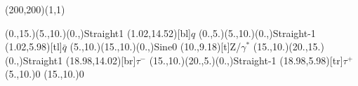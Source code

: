 \documentclass[12pt]{article}
\begin{document}
 
 \thispagestyle{empty}
	
 \begin{feynartspicture}(200,200)(1,1) 
 \FADiagram{} 

\FAProp(0.,15.)(5.,10.)(0.,){Straight}{1}
\FALabel(1.02,14.52)[bl]{$q$}
\FAProp(0.,5.)(5.,10.)(0.,){Straight}{-1}
\FALabel(1.02,5.98)[tl]{$\bar{q}$}
\FAProp(5.,10.)(15.,10.)(0.,){Sine}{0}
\FALabel(10.,9.18)[t]{Z/$\gamma^*$}
\FAProp(15.,10.)(20.,15.)(0.,){Straight}{1}
\FALabel(18.98,14.02)[br]{$\tau^-$}
\FAProp(15.,10.)(20.,5.)(0.,){Straight}{-1}
\FALabel(18.98,5.98)[tr]{$\tau^+$}
\FAVert(5.,10.){0}
\FAVert(15.,10.){0}

 
 \end{feynartspicture} 
 
\end{document}

